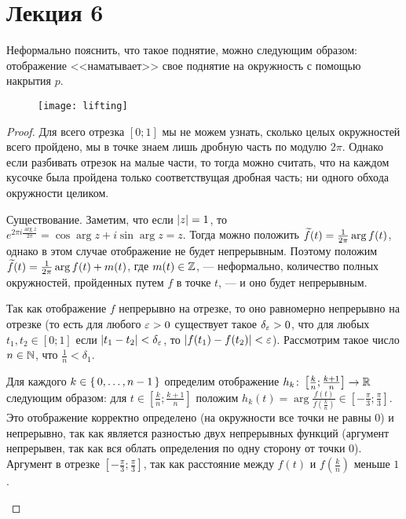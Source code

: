 \documentclass[main]{subfiles}
\begin{document}
\section{Лекция 6}

Неформально пояснить, что такое поднятие, можно следующим образом: отображение <<наматывает>> свое поднятие на
окружность с помощью накрытия $ p $.

\begin{figure}[H]
	\centering \texttt{[image: lifting]}
\end{figure}

\LiftExists

\begin{proof}
	Для всего отрезка $ [0; 1] $ мы не можем узнать, сколько целых окружностей всего пройдено, мы в
	точке знаем лишь дробную часть по модулю $ 2 \pi $. Однако если разбивать отрезок на малые
	части, то тогда можно считать, что на каждом кусочке была пройдена только соответствущая дробная часть;
	ни одного обхода окружности целиком.
	\begin{phased}
		\item[Существование.]
			Заметим, что если $ \left\vert z\right\vert = 1 $, то
			$ e^{2 \pi i \frac{\arg z}{2 \pi}} = \cos \arg z + i \sin \arg z = z $. Тогда можно положить
			$ \widetilde{f}(t) = \frac{1}{2 \pi} \arg f(t) $, однако в этом случае отображение не будет непрерывным.
			Поэтому положим $ \widetilde{f}(t) = \frac{1}{2 \pi} \arg f(t) + m(t) $, где $ m(t) \in \mathbb{Z} $, --- неформально,
			количество полных окружностей, пройденных путем $ f $ в точке $ t $, --- и оно будет непрерывным.

			Так как отображение $ f $ непрерывно на отрезке, то оно равномерно непрерывно на
			отрезке (то есть для любого $ \varepsilon > 0 $ существует такое $ \delta_\varepsilon > 0 $, что для любых
			$ t_1, t_2 \in [0; 1] $ если $ \left\vert t_1 - t_2\right\vert < \delta_\varepsilon $, то $ \left\vert f(t_1) - f(t_2)\right\vert < \varepsilon $).
			Рассмотрим такое число $ n \in \mathbb{N} $, что $ \frac{1}{n} < \delta_1 $.

			Для каждого
			$ k \in \left\{\,0, \ldots, n - 1\,\right\} $ определим отображение
			$ h_k \colon \left[ \frac{k}{n}; \frac{k+1}{n} \right] \to \mathbb{R} $ следующим образом: для
			$ t \in \left[ \frac{k}{n}; \frac{k+1}{n} \right] $ положим
				$ h_k(t) = \arg \frac{f(t)}{f \left( \frac{k}{n} \right)}
				\in \left[ -\frac{\pi}{3}; \frac{\pi}{3} \right] $.
			Это отображение корректно определено (на окружности все точки не равны 0) и непрерывно,
			так как является разностью двух непрерывных функций (аргумент непрерывен, так как вся облать определения
			по одну сторону от точки 0). Аргумент в отрезке $ \left[ -\frac{\pi}{3}; \frac{\pi}{3} \right] $, так как
			расстояние между $ f(t) $ и $ f \left( \frac{k}{n} \right) $ меньше $ 1 $.


\end{phased}
\end{proof}
\end{document}
